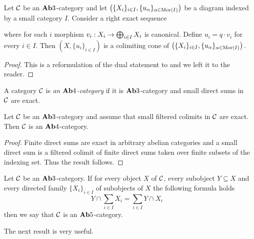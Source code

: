\begin{theorem}\label{theorem:descriptionofcolimitsinab3categories}
Let ${\mathcal C}$ be an $\mathbf{Ab}3$-category and let $\left(\{X_i\}_{i\in I},\{u_{\alpha}\}_{\alpha \in \mathrm{Mor}(I)}\right)$ be a diagram indexed by a small category $I$. Consider a right exact sequence
\begin{center}
\end{center}
where for each $i$ morphism $v_i:X_i \rightarrow \bigoplus_{i\in I}X_i$ is canonical. Define $u_i = q\cdot v_i$ for every $i\in I$. Then $\left(X,\{u_i\}_{i\in I}\right)$ is a colimiting cone of $\left(\{X_i\}_{i\in I},\{u_{\alpha}\}_{\alpha \in \mathrm{Mor}(I)}\right)$.
\end{theorem}
\begin{proof}
This is a reformulation of the dual statement to {\cite[page 113, Theorem 1]{Maclane}} and we left it to the reader.
\end{proof}

\begin{definition}
A category ${\mathcal C}$ is \textit{an $\mathbf{Ab}4$-category} if it is $\mathbf{Ab}3$-category and small direct sums in ${\mathcal C}$ are exact.
\end{definition}

\begin{fact}\label{fact:filteredcolimitsexactisab4}
Let ${\mathcal C}$ be an $\mathbf{Ab}3$-category and assume that small filtered colimits in ${\mathcal C}$ are exact. Then ${\mathcal C}$ is an $\mathbf{Ab}4$-category.
\end{fact}
\begin{proof}
Finite direct sums are exact in arbitrary abelian categories and a small direct sum is a filtered colimit of finite direct sums taken over finite subsets of the indexing set. Thus the result follows.
\end{proof}

\begin{definition}
Let ${\mathcal C}$ be an $\mathbf{Ab}3$-category. If for every object $X$ of ${\mathcal C}$, every subobject $Y\subseteq X$ and every directed family $\big\{X_i\}_{i\in I}$ of subobjects of $X$ the following formula holds
$$Y\cap \sum_{i\in I}X_i = \sum_{i\in I}Y\cap X_i$$
then we say that ${\mathcal C}$ is an $\mathbf{Ab}5$-category.
\end{definition}
\noindent
The next result is very useful.

